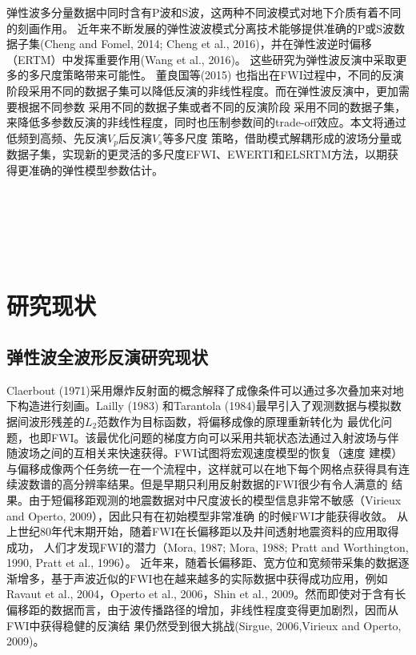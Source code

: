弹性波多分量数据中同时含有P波和S波，这两种不同波模式对地下介质有着不同的刻画作用。
近年来不断发展的弹性波波模式分离技术能够提供准确的P或S波数据子集(Cheng and Fomel,
2014\cite{cheng:2014b}; Cheng et al.,
2016\cite{cheng:2016})，并在弹性波逆时偏移（ERTM）中发挥重要作用(Wang et al.,
2016\cite{wang2016scalar})。
这些研究为弹性波反演中采取更多的多尺度策略带来可能性。
董良国等(2015)\cite{董良国2015}
也指出在FWI过程中，不同的反演阶段采用不同的数据子集可以降低反演的非线性程度。而在弹性波反演中，更加需要根据不同参数
采用不同的数据子集或者不同的反演阶段
采用不同的数据子集，来降低多参数反演的非线性程度，同时也压制参数间的trade-off效应。本文将通过低频到高频、先反演$V_p$后反演$V_s$等多尺度
策略，借助模式解耦形成的波场分量或数据子集，实现新的更灵活的多尺度EFWI、EWERTI和ELSRTM方法，以期获得更准确的弹性模型参数估计。

$\quad$

$\quad$

$\quad$
\section{研究现状}
\subsection{弹性波全波形反演研究现状}
Claerbout
(1971\cite{Claerbout1971})采用爆炸反射面的概念解释了成像条件可以通过多次叠加来对地下构造进行刻画。Lailly
(1983)\cite{lailly1983seismic}
和Tarantola (1984)\cite{tarantola1984}最早引入了观测数据与模拟数据间波形残差的$L_2$范数作为目标函数，将偏移成像的原理重新转化为
最优化问题，也即FWI。该最优化问题的梯度方向可以采用共轭状态法通过入射波场与伴随波场之间的互相关来快速获得。FWI试图将宏观速度模型的恢复（速度
建模）与偏移成像两个任务统一在一个流程中，这样就可以在地下每个网格点获得具有连续波数谱的高分辨率结果。但是早期只利用反射数据的FWI很少有令人满意的
结果。由于短偏移距观测的地震数据对中尺度波长的模型信息非常不敏感（Virieux and Operto,
2009\cite{virieux2009overview}），因此只有在初始模型非常准确
的时候FWI才能获得收敛。
从上世纪80年代末期开始，随着FWI在长偏移距以及井间透射地震资料的应用取得成功，
人们才发现FWI的潜力（Mora, 1987\cite{mora:1987}; Mora, 1988\cite{mora1988elastic}; Pratt
and Worthington, 1990\cite{PRATTEtAl1990}, Pratt et al., 1996\cite{pratt1996two}）。
近年来，随着长偏移距、宽方位和宽频带采集的数据逐渐增多，基于声波近似的FWI也在越来越多的实际数据中获得成功应用，例如Ravaut
et al., 2004\cite{RavautEtAl2004}，Operto et al., 2006\cite{Operto2006}，Shin et al.,
2009\cite{ShinEtAl2009}。然而即使对于含有长偏移距的数据而言，由于波传播路径的增加，非线性程度变得更加剧烈，因而从FWI中获得稳健的反演结
果仍然受到很大挑战(Sirgue, 2006\cite{sirgue2006importance},Virieux and Operto,
2009\cite{virieux2009overview})。

